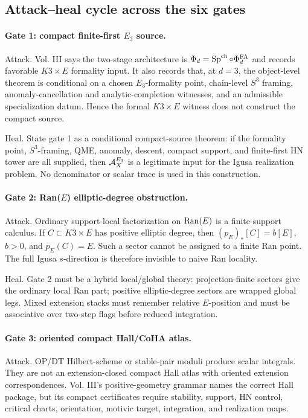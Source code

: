 \subsection{Attack--heal cycle across the six gates}

\paragraph{Gate 1: compact finite-first \(E_3\) source.}
Attack.  Vol. III says the two-stage architecture is
\(\Phi_d=\operatorname{Sp}^{\operatorname{ch}}\circ\Phi^{\operatorname{FA}}_d\) and records favorable \(K3\times E\)
formality input.  It also records that, at \(d=3\), the object-level theorem
is conditional on a chosen \(E_3\)-formality point, chain-level \(S^3\)
framing, anomaly-cancellation and analytic-completion witnesses, and an
admissible specialization datum.  Hence the formal \(K3\times E\) witness
does not construct the compact source.

Heal.  State gate 1 as a conditional compact-source theorem: if the
formality point, \(S^3\)-framing, QME, anomaly, descent, compact support,
and finite-first HN tower are all supplied, then \(\mathcal A^{E_3}_X\) is a legitimate
input for the Igusa realization problem.  No denominator or scalar trace is
used in this construction.

\paragraph{Gate 2: Ran(\(E\)) elliptic-degree obstruction.}
Attack.  Ordinary support-local factorization on \(\operatorname{Ran}(E)\) is a
finite-support calculus.  If \(C\subset K3\times E\) has positive elliptic
degree, then \((p_E)_*[C]=b[E]\), \(b>0\), and \(p_E(C)=E\).  Such a sector
cannot be assigned to a finite Ran point.  The full Igusa \(s\)-direction is
therefore invisible to naive Ran locality.

Heal.  Gate 2 must be a hybrid local/global theory: projection-finite
sectors give the ordinary local Ran part; positive elliptic-degree sectors
are wrapped global legs.  Mixed extension stacks must remember relative
\(E\)-position and must be associative over two-step flags before reduced
integration.

\paragraph{Gate 3: oriented compact Hall/CoHA atlas.}
Attack.  OP/DT Hilbert-scheme or stable-pair moduli produce scalar
integrals.  They are not an extension-closed compact Hall atlas with
oriented extension correspondences.  Vol. III's positive-geometry grammar
names the correct Hall package, but its compact certificates require
stability, support, HN control, critical charts, orientation, motivic
target, integration, and realization maps.

